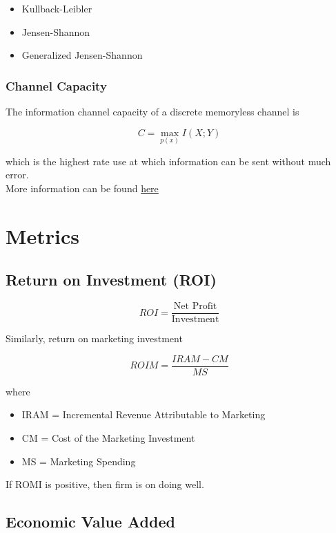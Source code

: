 \documentclass[
]{book}
\providecommand{\tightlist}{%
  \setlength{\itemsep}{0pt}\setlength{\parskip}{0pt}}
\begin{document}
\begin{itemize}
\tightlist
\item
  Kullback-Leibler
\item
  Jensen-Shannon
\item
  Generalized Jensen-Shannon
\end{itemize}

\hypertarget{channel-capacity}{%
\subsection{Channel Capacity}\label{channel-capacity}}

The information channel capacity of a discrete memoryless channel is

\[
C = \max_{p(x)} I(X;Y)
\]

which is the highest rate use at which information can be sent without much error.\\
More information can be found \href{http://www.di.fc.ul.pt/~jpn/r/inf_theory/informationtheory.html}{here}

\hypertarget{metrics}{%
\chapter{Metrics}\label{metrics}}

\hypertarget{return-on-investment-roi}{%
\section{Return on Investment (ROI)}\label{return-on-investment-roi}}

\[
ROI = \frac{\text{Net Profit}}{\text{Investment}}
\]

Similarly, return on marketing investment

\[
ROIM = \frac{IRAM - CM}{MS}
\]

where

\begin{itemize}
\tightlist
\item
  IRAM = Incremental Revenue Attributable to Marketing
\item
  CM = Cost of the Marketing Investment
\item
  MS = Marketing Spending
\end{itemize}

If ROMI is positive, then firm is on doing well.

\hypertarget{economic-value-added}{%
\section{Economic Value Added}\label{economic-value-added}}
\end{document}

